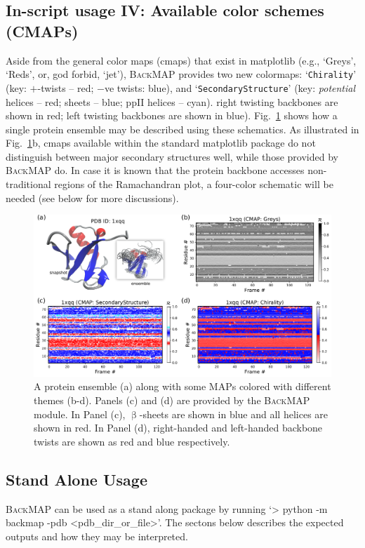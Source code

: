 \documentclass[fleqn,10pt,lineno]{wlpeerj} %
\newcommand{\Fig}[1]{Fig.~\ref{#1}}
\newcommand{\gname}{BackMAP}
\newcommand{\pname}{\textsc{\gname}\xspace}
\newcommand{\code}[1]{\texttt{#1}\xspace}
\begin{document}
\subsection*{In-script usage IV: Available color schemes (CMAPs)}
Aside from the general color maps (cmaps) that exist in matplotlib (e.g., `Greys', `Reds', or, god forbid, `jet'), 
\pname provides two new colormaps: `\code{Chirality}' (key: $+$-twists -- red; $-$ve twists: blue), and `\code{SecondaryStructure}' (key: {\it potential} helices -- red; sheets -- blue; ppII helices -- cyan). right twisting backbones are shown in red; left twisting backbones are shown in blue). \Fig{fig:cmaps} shows how a single protein ensemble
may be described using these schematics. As illustrated in \Fig{fig:cmaps}b, cmaps available within the standard matplotlib package do not distinguish between major secondary structures well, while those provided by \pname do. In case it is known that the protein backbone accesses non-traditional regions of the Ramachandran plot, a four-color schematic will be needed (see below for more discussions).

\begin{figure}[h!]
\centering
\includegraphics[width=0.9\linewidth]{figures/cmaps.pdf}
\caption{A protein ensemble (a) along with some MAPs colored with different themes (b-d). Panels (c) and (d) are provided by the \pname module. In Panel (c), $\upbeta$-sheets are shown in blue and all helices are shown in red. In Panel (d), right-handed and left-handed backbone twists are shown as red and blue respectively.\label{fig:cmaps}} 
\end{figure}

\subsection*{Stand Alone Usage}

\pname can be used as a stand along package by running `> python -m backmap -pdb <pdb\_dir\_or\_file>'. The sectons below describes the expected outputs and how they may be interpreted.
\end{document}
